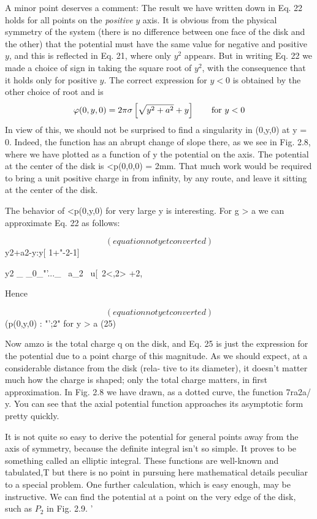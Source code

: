 A minor point deserves a comment: The result we have written
down in Eq. 22 holds for all points on the \emph{positive} $y$ axis. It is obvious
from the physical symmetry of the system (there is no difference between
one face of the disk and the other) that the potential must have
the same value for negative and positive $y$, and this is reflected in
Eq. 21, where only $y^2$ appears. But in writing Eq. 22 we made a
choice of sign in taking the square root of $y^2$, with the consequence
that it holds only for positive $y$. The correct expression for $y < 0$ is
obtained by the other choice of root and is
\begin{equation}
  \varphi(0,y,0) = 2\pi\sigma\left[\sqrt{y^2+a^2}+y\right] \qquad \text{for $y<0$}
\end{equation}
In view of this, we should not be surprised to find a singularity in
\pot(0,y,0) at y = 0. Indeed, the function has an abrupt change of
slope there, as we see in Fig. 2.8, where we have plotted as a function
of y the potential on the axis. The potential at the center of the disk
is <p(0,0,0) = 2mm. That much work would be required to bring a
unit positive charge in from infinity, by any route, and leave it sitting
at the center of the disk.

The behavior of <p(0,y,0) for very large y is interesting. For g > a
we can approximate Eq. 22 as follows:

\begin{equation}
(equation not yet converted)
\end{equation}
\/y2+a2-y:y[ 1+"-2-1]

y2
_ _0_"'..._ ~a_2
~u[~2<,2> +2, 

Hence

\begin{equation}
(equation not yet converted)
\end{equation}
(p(0,y,0) : "';2" for y > a (25)

Now amzo is the total charge q on the disk, and Eq. 25 is just the expression
for the potential due to a point charge of this magnitude.
As we should expect, at a considerable distance from the disk (rela-
tive to its diameter), it doesn't matter much how the charge is shaped;
only the total charge matters, in first approximation. In Fig. 2.8 we
have drawn, as a dotted curve, the function 7ra2a/ y. You can see that
the axial potential function approaches its asymptotic form pretty
quickly.

It is not quite so easy to derive the potential for general points
away from the axis of symmetry, because the definite integral isn't so
simple. It proves to be something called an elliptic integral. These
functions are well-known and tabulated,T but there is no point in
pursuing here mathematical details peculiar to a special problem.
One further calculation, which is easy enough, may be instructive.
We can find the potential at a point on the very edge of the disk, such
as $P_2$ in Fig. 2.9. '

